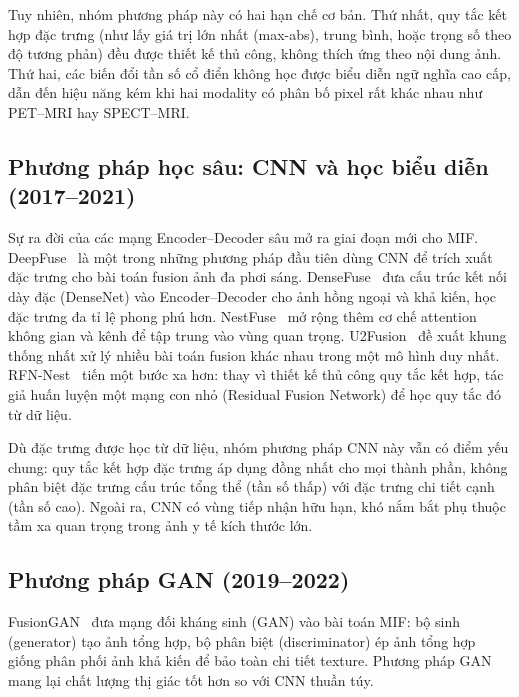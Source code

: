 Tuy nhiên, nhóm phương pháp này có hai hạn chế cơ bản. Thứ nhất, quy tắc kết hợp đặc trưng (như lấy giá trị lớn nhất (max-abs), trung bình, hoặc trọng số theo độ tương phản) đều được thiết kế thủ công, không thích ứng theo nội dung ảnh. Thứ hai, các biến đổi tần số cổ điển không học được biểu diễn ngữ nghĩa cao cấp, dẫn đến hiệu năng kém khi hai modality có phân bố pixel rất khác nhau như PET--MRI hay SPECT--MRI.

\subsection{Phương pháp học sâu: CNN và học biểu diễn (2017--2021)}
\label{ssec:related-cnn}

Sự ra đời của các mạng Encoder--Decoder sâu mở ra giai đoạn mới cho MIF. DeepFuse~\cite{prabhakar2017deepfuse} là một trong những phương pháp đầu tiên dùng CNN để trích xuất đặc trưng cho bài toán fusion ảnh đa phơi sáng. DenseFuse~\cite{li2019densefuse} đưa cấu trúc kết nối dày đặc (DenseNet) vào Encoder--Decoder cho ảnh hồng ngoại và khả kiến, học đặc trưng đa tỉ lệ phong phú hơn. NestFuse~\cite{li2020nestfuse} mở rộng thêm cơ chế attention không gian và kênh để tập trung vào vùng quan trọng. U2Fusion~\cite{xu2020u2fusion} đề xuất khung thống nhất xử lý nhiều bài toán fusion khác nhau trong một mô hình duy nhất. RFN-Nest~\cite{li2021rfnnest} tiến một bước xa hơn: thay vì thiết kế thủ công quy tắc kết hợp, tác giả huấn luyện một mạng con nhỏ (Residual Fusion Network) để học quy tắc đó từ dữ liệu.

Dù đặc trưng được học từ dữ liệu, nhóm phương pháp CNN này vẫn có điểm yếu chung: quy tắc kết hợp đặc trưng áp dụng đồng nhất cho mọi thành phần, không phân biệt đặc trưng cấu trúc tổng thể (tần số thấp) với đặc trưng chi tiết cạnh (tần số cao). Ngoài ra, CNN có vùng tiếp nhận hữu hạn, khó nắm bắt phụ thuộc tầm xa quan trọng trong ảnh y tế kích thước lớn.

\subsection{Phương pháp GAN (2019--2022)}
\label{ssec:related-gan}

FusionGAN~\cite{ma2019fusiongan} đưa mạng đối kháng sinh (GAN) vào bài toán MIF: bộ sinh (generator) tạo ảnh tổng hợp, bộ phân biệt (discriminator) ép ảnh tổng hợp giống phân phối ảnh khả kiến để bảo toàn chi tiết texture. Phương pháp GAN mang lại chất lượng thị giác tốt hơn so với CNN thuần túy.

